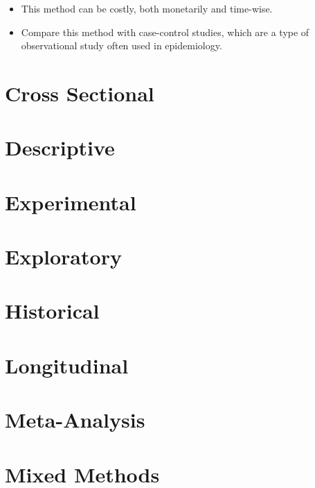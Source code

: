 \documentclass[]{book}
\providecommand{\tightlist}{%
  \setlength{\itemsep}{0pt}\setlength{\parskip}{0pt}}
\begin{document}
\begin{itemize}
\tightlist
\item
  This method can be costly, both monetarily and time-wise.
\item
  Compare this method with case-control studies, which are a type of observational study often used in epidemiology.
\end{itemize}

\hypertarget{cross-sectional}{%
\section{Cross Sectional}\label{cross-sectional}}

\hypertarget{descriptive}{%
\section{Descriptive}\label{descriptive}}

\hypertarget{experimental}{%
\section{Experimental}\label{experimental}}

\hypertarget{exploratory}{%
\section{Exploratory}\label{exploratory}}

\hypertarget{historical}{%
\section{Historical}\label{historical}}

\hypertarget{longitudinal}{%
\section{Longitudinal}\label{longitudinal}}

\hypertarget{meta-analysis}{%
\section{Meta-Analysis}\label{meta-analysis}}

\hypertarget{mixed-methods}{%
\section{Mixed Methods}\label{mixed-methods}}
\end{document}
